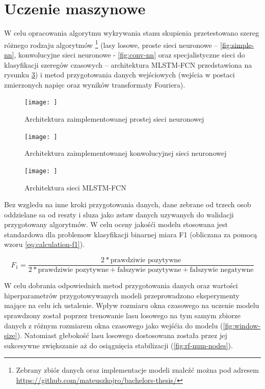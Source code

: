 \documentclass{./assets/wfis}
\begin{document}
\section{Uczenie maszynowe}\label{uczenie-maszynowe}
W celu opracowania algorytmu wykrywania stanu skupienia przetestowano szereg różnego rodzaju algorytmów \footnote{Zebrany zbiór danych oraz implementacje modeli znaleźć można pod adresem \url{https://github.com/mateuszkojro/bachelors-thesis/}} (lasy losowe, proste sieci neuronowe – \autoref{fig:simple-nn}, konwolucyjne sieci neuronowe - \autoref{fig:conv-nn} oraz specjalistyczne sieci do klasyfikacji szeregów czasowych – architektura MLSTM-FCN \cite{karim_multivariate_2019} przedstawiona na rysunku \ref{fig:mlstm}) i metod przygotowania danych wejściowych (wejścia w postaci zmierzonych napięc oraz wyników transformaty Fouriera).

\begin{figure}[h!]
    \centering
    \texttt{[image: ]}
    \caption{Architektura zaimplementowanej prostej sieci neuronowej}
    \label{fig:simple-nn}
\end{figure}

\begin{figure}[h!]
    \centering
    \texttt{[image: ]}
    \caption{Architektura zaimplementowanej konwolucyjnej sieci neuronowej}
    \label{fig:conv-nn}
\end{figure}

\begin{figure}[h!]
    \centering
    \texttt{[image: ]}
    \caption{Architektura sieci MLSTM-FCN}
    \label{fig:mlstm}
\end{figure}

Bez wzgledu na inne kroki przygotowania danych, dane zebrane od trzech osob oddzielane sa od reszty i sluza jako zstaw danych uzywanych do walidacji przygotowany algorytmów. W celu oceny jakośći modelu stosowana jest standardowa dla problemow klasyfikacji binarnej miara F1 (obliczana za pomocą wzoru \ref{eq:calculation-f1}).

\begin{equation}\label{eq:calculation-f1}
    F_1 = \frac{2*\text{prawdziwie pozytywne}}{2*\text{prawdziwie pozytywne}+\text{fałszywie pozytywne}+\text{fałszywie negatywne}}
\end{equation}


W celu dobrania odpowiednich metod przygotowania danych oraz wartości hiperparametrów przygotowywanych modeli przeprowadzono eksperymenty mające na celu ich ustalenie. Wpływ rozmiaru okna czasowego na uczenie modelu sprawdzony został poprzez trenowanie lasu losowego na tym samym zbiorze danych z różnym rozmiarem okna czasowego jako wejśćia do modelu (\autoref{fig:window-size}). Natomiast głebokość lasu losowego dostosowana została przez jej sukcesywne zwiększanie aż do osiągnięcia stabilizacji (\autoref{fig:rf-num-nodes}).
\end{document}
